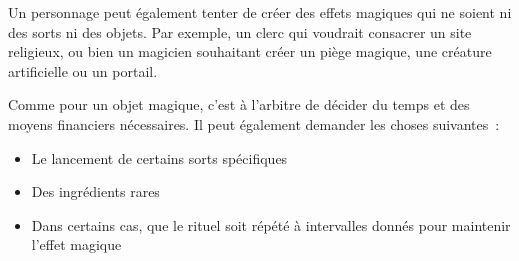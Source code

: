 Un personnage peut également tenter de créer des effets magiques qui ne
soient ni des sorts ni des objets. Par exemple, un clerc qui voudrait
consacrer un site religieux, ou bien un magicien souhaitant créer un
piège magique, une créature artificielle ou un portail.

Comme pour un objet magique, c'est à l'arbitre de décider du temps et
des moyens financiers nécessaires. Il peut également demander les choses
suivantes~:

\begin{itemize}
  \item
  Le lancement de certains sorts spécifiques
  \item
  Des ingrédients rares
  \item
  Dans certains cas, que le rituel soit répété à intervalles donnés pour
  maintenir l'effet magique
\end{itemize}